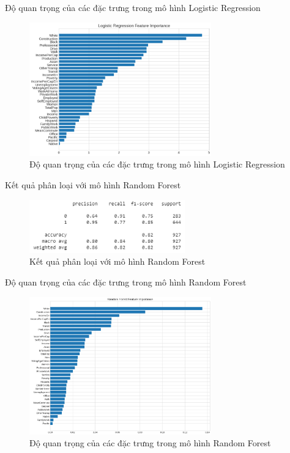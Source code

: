 \documentclass[10pt]{beamer}
\theoremstyle{remark}
\theoremstyle{definition}
\begin{document}
\begin{frame}{Độ quan trọng của các đặc trưng trong mô hình Logistic Regression}
	\begin{figure}[h!]
        \centering
        \includegraphics[width=0.7\textwidth]{figures/Logistic_Regression_Feature_Importance.png}
        \caption{Độ quan trọng của các đặc trưng trong mô hình Logistic Regression}
    \end{figure}
\end{frame}

\begin{frame}{Kết quả phân loại với mô hình Random Forest}
	\begin{figure}[h!]
        \centering
        \includegraphics[width=0.6\textwidth]{figures/Random_Forest_Feature_Report.png}
        \caption{Kết quả phân loại với mô hình Random Forest}
    \end{figure}
\end{frame}

\begin{frame}{Độ quan trọng của các đặc trưng trong mô hình Random Forest}
	\begin{figure}[h!]
        \centering
        \includegraphics[width=0.7\textwidth]{figures/Random_Forest_Feature_Importance.png}
        \caption{Độ quan trọng của các đặc trưng trong mô hình Random Forest}
    \end{figure}
\end{frame}
\end{document}
